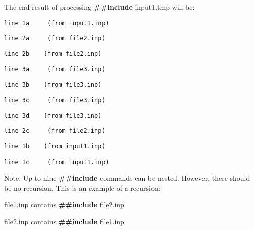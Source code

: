 The end result of processing \textbf{\#\#include} input1.tmp will be:

\begin{lstlisting}
line 1a     (from input1.inp)
\end{lstlisting}

\begin{lstlisting}
line 2a     (from file2.inp)
\end{lstlisting}

\begin{lstlisting}
line 2b    (from file2.inp)
\end{lstlisting}

\begin{lstlisting}
line 3a     (from file3.inp)
\end{lstlisting}

\begin{lstlisting}
line 3b    (from file3.inp)
\end{lstlisting}

\begin{lstlisting}
line 3c     (from file3.inp)
\end{lstlisting}

\begin{lstlisting}
line 3d    (from file3.inp)
\end{lstlisting}

\begin{lstlisting}
line 2c     (from file2.inp)
\end{lstlisting}

\begin{lstlisting}
line 1b    (from input1.inp)
\end{lstlisting}

\begin{lstlisting}
line 1c     (from input1.inp)
\end{lstlisting}

Note: Up to nine \textbf{\#\#include} commands can be nested. However, there should be no recursion. This is an example of a recursion:

file1.inp contains \textbf{\#\#include} file2.inp

file2.inp contains \textbf{\#\#include} file1.inp
